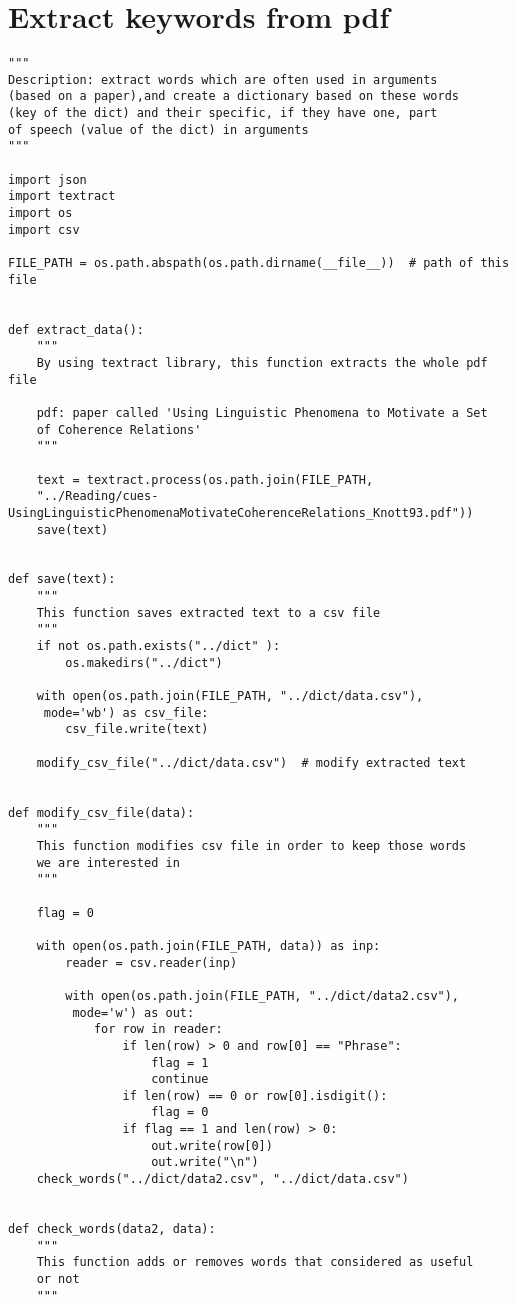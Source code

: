 
\chapter{Extract keywords from pdf}

\label{Appendix6}

\begin{lstlisting}[language=iPython]
"""
Description: extract words which are often used in arguments 
(based on a paper),and create a dictionary based on these words
(key of the dict) and their specific, if they have one, part
of speech (value of the dict) in arguments
"""

import json
import textract
import os
import csv

FILE_PATH = os.path.abspath(os.path.dirname(__file__))  # path of this file


def extract_data():
	"""
	By using textract library, this function extracts the whole pdf file
	
	pdf: paper called 'Using Linguistic Phenomena to Motivate a Set
	of Coherence Relations'
	"""
	
	text = textract.process(os.path.join(FILE_PATH,
	"../Reading/cues-UsingLinguisticPhenomenaMotivateCoherenceRelations_Knott93.pdf"))
	save(text)


def save(text):
	"""
	This function saves extracted text to a csv file
	"""
	if not os.path.exists("../dict" ):
		os.makedirs("../dict")
		
	with open(os.path.join(FILE_PATH, "../dict/data.csv"),
	 mode='wb') as csv_file:
		csv_file.write(text)
		
	modify_csv_file("../dict/data.csv")  # modify extracted text


def modify_csv_file(data):
	"""
	This function modifies csv file in order to keep those words 
	we are interested in
	"""
	
	flag = 0
	
	with open(os.path.join(FILE_PATH, data)) as inp:
		reader = csv.reader(inp)
		
		with open(os.path.join(FILE_PATH, "../dict/data2.csv"),
		 mode='w') as out:
			for row in reader:
				if len(row) > 0 and row[0] == "Phrase":
					flag = 1
					continue
				if len(row) == 0 or row[0].isdigit():
					flag = 0
				if flag == 1 and len(row) > 0:
					out.write(row[0])
					out.write("\n")
	check_words("../dict/data2.csv", "../dict/data.csv")


def check_words(data2, data):
	"""
	This function adds or removes words that considered as useful 
	or not
	"""
	

\end{lstlisting}
